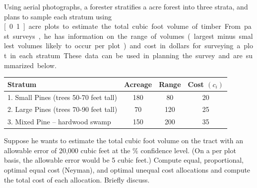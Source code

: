 \documentclass[usenames,dvipsnames]{homework}
\begin{document}
\begin{longproblem}
  Using aerial photographs, a forester stratifies a \unit[400]{acre} forest into three strata, and plans to sample each stratum using \unit[0.1]{acre} plots to estimate the total cubic foot volume of timber.  From past surveys, he has information on the range of volumes (largest minus smallest volumes likely to occur per plot) and cost in dollars for surveying a plot in each stratum.  These data can be used in planning the survey and are summarized below.

  \begin{center}
  \renewcommand{\arraystretch}{1.3}
  \begin{tabular}{l c c c}
  \hline
  Stratum			         & Acreage & Range & Cost $(c_i)$ \\ \hline
  1. Small Pines (trees 50-70 feet tall) & 180     & 80    & 20           \\
  2. Large Pines (trees 70-90 feet tall) & 70      & 120   & 25           \\
  3. Mixed Pine -- hardwood swamp        & 150     & 200   & 35           \\ \hline
  \end{tabular}
  \end{center}
  Suppose he wants to estimate the total cubic foot volume on the tract with an allowable error of 20,000 cubic feet at the \unit[95]{\%} confidence level. (On a per plot basis, the allowable error would be 5 cubic feet.)  Compute equal, proportional, optimal equal cost (Neyman), and optimal unequal cost allocations and compute the total cost of each allocation.  Briefly discuss.

\newpage
\end{longproblem}
\end{document}
